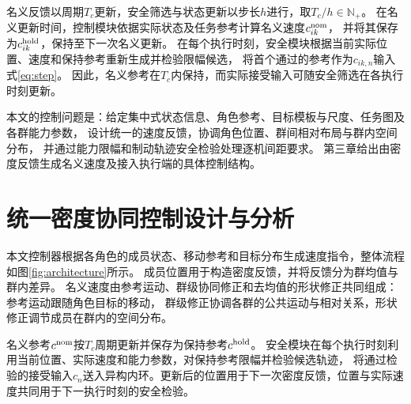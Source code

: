 \documentclass[UTF8,a4paper,11pt,fontset=none]{ctexart}
\begin{document}
名义反馈以周期$T_c$更新，安全筛选与状态更新以步长$h$进行，取$T_c/h\in\mathbb N_+$。
在名义更新时间，控制模块依据实际状态及任务参考计算名义速度$c^{\rm nom}_{ik}$，
并将其保存为$c^{\rm hold}_{ik}$，保持至下一次名义更新。
在每个执行时刻，安全模块根据当前实际位置、速度和保持参考重新生成并检验限幅候选，
将首个通过的参考作为$c_{ik,n}$输入式\eqref{eq:step}。
因此，名义参考在$T_c$内保持，而实际接受输入可随安全筛选在各执行时刻更新。

本文的控制问题是：给定集中式状态信息、角色参考、目标模板与尺度、任务图及各群能力参数，
设计统一的速度反馈，协调角色位置、群间相对布局与群内空间分布，
并通过能力限幅和制动轨迹安全检验处理逐机间距要求。
第三章给出由密度反馈生成名义速度及接入执行端的具体控制结构。

\section{统一密度协同控制设计与分析}\label{sec:control}
本文控制器根据各角色的成员状态、移动参考和目标分布生成速度指令，整体流程如图\ref{fig:architecture}所示。
成员位置用于构造密度反馈，并将反馈分为群均值与群内差异。
名义速度由参考运动、群级协同修正和去均值的形状修正共同组成：参考运动跟随角色目标的移动，
群级修正协调各群的公共运动与相对关系，形状修正调节成员在群内的空间分布。

名义参考$c^{\rm nom}$按$T_c$周期更新并保存为保持参考$c^{\rm hold}$。
安全模块在每个执行时刻利用当前位置、实际速度和能力参数，对保持参考限幅并检验候选轨迹，
将通过检验的接受输入$c_n$送入异构内环。更新后的位置用于下一次密度反馈，位置与实际速度共同用于下一执行时刻的安全检验。
\end{document}
